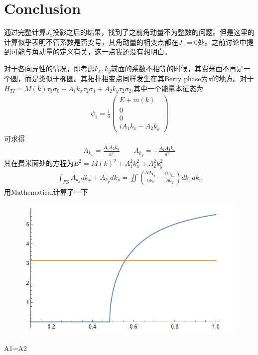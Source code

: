 \documentclass[22pt]{article}
\begin{document}
\section*{Conclusion}
通过完整计算$J_z$投影之后的结果，找到了之前角动量不为整数的问题。但是这里的计算似乎表明不管系数是否变号，其角动量的相变点都在$J_z=0$处。之前讨论中提到可能与角动量的定义有关，这一点我还没有想明白。
\par 
对于各向异性的情况，即考虑$k_x,k_y$前面的系数不相等的时候，其费米面不再是一个圆，而是类似于椭圆。其拓扑相变点同样发生在其Berry phase为$\pi$的地方。对于$H_{TI}=M(k)\tau_3\sigma_0+A_1k_x\tau_2\sigma_1+A_2k_y\tau_2\sigma_2$,其中一个能量本征态为
\begin{align}
	\psi_1=
	\frac{1}{a}
	\begin{pmatrix}
		E+m(k)
		\\0\\0\\
		iA_1k_x-A_2k_y
	\end{pmatrix}
\end{align}
可求得
\begin{align}
	A_{k_x}=\frac{A_1A_2k_y}{a^2}\qquad
	A_{k_y}=-\frac{A_1A_2k_x}{a^2}
\end{align}
其在费米面处的方程为$E^2=M(k)^2+A_1^2k_x^2+A_2^2k_y^2$
\begin{align}
	\int_{FS}A_{k_x}dk_x+A_{k_y}dk_y=\iint(\frac{\partial A_{k_y}}{\partial k_x}-\frac{\partial A_{k_x}}{\partial k_y})dk_xdk_y
\end{align}
用Mathematical计算了一下
\begin{figure}[H]
	\centering
	\includegraphics[scale=0.5]{Picture/3}
\end{figure}
A1=A2
\end{document}

